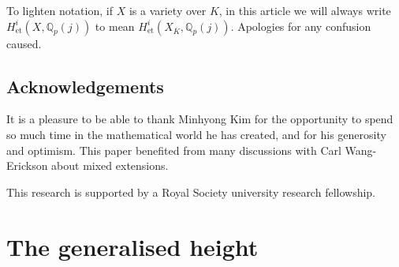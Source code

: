 \documentclass[11pt]{amsart}
\def\Q{\mathbb Q}
\theoremstyle{plain}
\theoremstyle{definition}
\newcommand{\et}{\mathrm{et}}
\begin{document}
To lighten notation, if $X$ is a variety over $K$, in this article we will always write $H^i _{\et }(X,\Q _p (j))$ to mean $H^i _{\et }(X_{\overline{K}},\Q _p (j))$. Apologies for any confusion caused.
\subsection*{Acknowledgements}
It is a pleasure to be able to thank Minhyong Kim for the opportunity to spend so much time in the mathematical world he has created, and for his generosity and optimism. This paper benefited from many discussions with Carl Wang-Erickson about mixed extensions.

This research is supported by a Royal Society university research fellowship.
\section{The generalised height}
\end{document}
